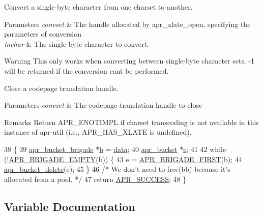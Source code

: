 Convert a single-\/byte character from one charset to another. 
\begin{DoxyParams}{Parameters}
{\em convset} & The handle allocated by apr\+\_\+xlate\+\_\+open, specifying the parameters of conversion \\
\hline
{\em inchar} & The single-\/byte character to convert. \\
\hline
\end{DoxyParams}
\begin{DoxyWarning}{Warning}
This only works when converting between single-\/byte character sets. -\/1 will be returned if the conversion can\textquotesingle{}t be performed.
\end{DoxyWarning}
Close a codepage translation handle. 
\begin{DoxyParams}{Parameters}
{\em convset} & The codepage translation handle to close \\
\hline
\end{DoxyParams}
\begin{DoxyRemark}{Remarks}
Return A\+P\+R\+\_\+\+E\+N\+O\+T\+I\+M\+PL if charset transcoding is not available in this instance of apr-\/util (i.\+e., A\+P\+R\+\_\+\+H\+A\+S\+\_\+\+X\+L\+A\+TE is undefined). 
\end{DoxyRemark}

\begin{DoxyCode}
38 \{
39     \hyperlink{structapr__bucket__brigade}{apr\_bucket\_brigade} *\hyperlink{group__APACHE__CORE__PROTO_ga7fa09c5c80a7d25b74511944f5949e31}{b} = \hyperlink{group__APACHE__CORE__LOG_gae4950db1dbfff8459a712737063b61aa}{data};
40     \hyperlink{structapr__bucket}{apr\_bucket} *\hyperlink{group__APR__Util__Bucket__Brigades_gacd90314acb2c2e5cd19681136c08efac}{e};
41 
42     \textcolor{keywordflow}{while} (!\hyperlink{group__APR__Util__Bucket__Brigades_ga836f61da6cce15074eff257ce4b6fc0f}{APR\_BRIGADE\_EMPTY}(b)) \{
43         e = \hyperlink{group__APR__Util__Bucket__Brigades_gab5826a11eb6ba90786a94282f806c230}{APR\_BRIGADE\_FIRST}(b);
44         \hyperlink{group__APR__Util__Bucket__Brigades_ga8925c02a7f95e8c1c3986294d4678797}{apr\_bucket\_delete}(e);
45     \}
46     \textcolor{comment}{/* We don't need to free(bb) because it's allocated from a pool. */}
47     \textcolor{keywordflow}{return} \hyperlink{group__apr__errno_ga9ee311b7bf1c691dc521d721339ee2a6}{APR\_SUCCESS};
48 \}
\end{DoxyCode}


\subsection{Variable Documentation}

